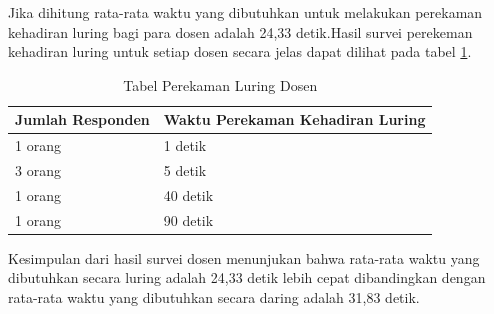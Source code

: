 \begin{enumerate}
	Jika dihitung rata-rata waktu yang dibutuhkan untuk melakukan perekaman kehadiran luring bagi para dosen adalah 24,33 detik.Hasil survei perekeman kehadiran luring untuk setiap dosen secara jelas dapat dilihat pada tabel \ref{tab:luringDosen}.	
	\begin{table}[ht]			
		\caption{Tabel Perekaman Luring Dosen}
		\centering
		\begin{tabular}{|p{4cm} |p{7cm}|}
			\hline
			Jumlah Responden &  Waktu Perekaman Kehadiran Luring \\ \hline     
			1 orang &  1 detik\\ \hline 
			3 orang &  5 detik\\ \hline 
			1 orang &  40 detik\\ \hline 
			1 orang &  90 detik\\ \hline 
		\end{tabular}
		\label{tab:luringDosen}
	\end{table}
\end{enumerate}

Kesimpulan dari hasil survei dosen menunjukan bahwa rata-rata waktu yang dibutuhkan secara luring adalah 24,33 detik lebih cepat dibandingkan dengan rata-rata waktu yang dibutuhkan secara daring adalah 31,83 detik.

